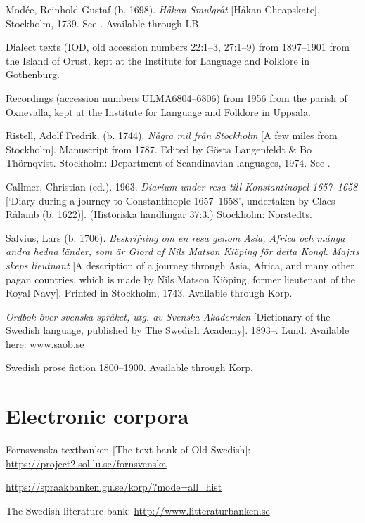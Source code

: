 \documentclass[output=paper]{langscibook}
\begin{document}
\begin{description}[font=\normalfont]
\item[Modée:] Modée, Reinhold Gustaf (b. 1698). \textit{Håkan Smulgråt} [Håkan Cheapskate]. Stockholm, 1739. See \citet{MarttalaStromquist2001}. Available through LB.
\item[Orust:] Dialect texts (IOD, old accession numbers 22:1–3, 27:1–9) from 1897–1901 from the Island of Orust, kept at the Institute for Language and Folklore in Gothenburg.
\item[Öxn:] Recordings (accession numbers ULMA6804–6806) from 1956 from the parish of Öxnevalla, kept at the Institute for Language and Folklore in Uppsala.
\item[Ristell:] Ristell, Adolf Fredrik. (b. 1744). \textit{Några mil från Stockholm} [A few miles from Stockholm]. Manuscript from 1787. Edited by Gösta Langenfeldt \& Bo Thörnqvist. Stockholm: Department of Scandinavian languages, 1974. See \citet{MarttalaStromquist2001}.
\item[Rålamb:] Callmer, Christian (ed.). 1963. \textit{Diarium under resa till Konstantinopel 1657–1658} [`Diary during a journey to Constantinople 1657–1658’, undertaken by Claes Rålamb (b. 1622)]. (Historiska handlingar 37:3.) Stockholm: Norstedts.
\item[Salvius:] Salvius, Lars (b. 1706). \textit{Beskrifning om en resa genom Asia, Africa och många andra hedna länder, som är Giord af Nils Matson Kiöping för detta Kongl. Maj:ts skeps lieutnant} [A description of a journey through Asia, Africa, and many other pagan countries, which is made by Nils Matson Kiöping, former lieutenant of the Royal Navy]. Printed in Stockholm, 1743. Available through Korp.
\item[SAOB:] \textit{Ordbok över svenska språket, utg. av Svenska Akademien} [Dictionary of the Swedish language, published by The Swedish Academy]. 1893–. Lund. Available here: \href{http://www.saob.se}{{www.saob.se}}
\item[SPF:] Swedish prose fiction 1800–1900. Available through Korp.
\end{description}

\section*{Electronic corpora}

\begin{description}[font=\normalfont]
\item[FTB:] Fornsvenska textbanken [The text bank of Old Swedish]: \url{https://project2.sol.lu.se/fornsvenska} 
\item[Korp:] \url{https://spraakbanken.gu.se/korp/?mode=all_hist}
\item[LB:] The Swedish literature bank: \url{http://www.litteraturbanken.se}
\end{description}

{\sloppy\printbibliography[heading=subbibliography,notkeyword=this]}
\end{document}
